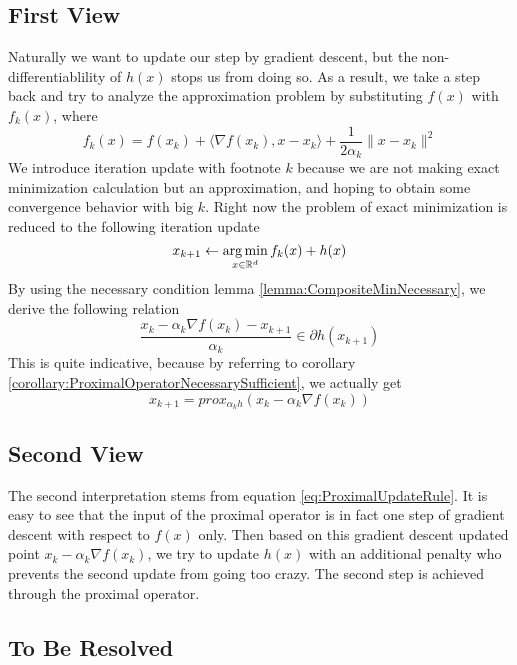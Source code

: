 \subsection*{First View}
Naturally we want to update our step by gradient descent, but the non-differentiablility of $h(x)$ stops us from doing so. As a result, we take a step back and try to analyze the approximation problem by substituting $f(x)$ with $f_k(x)$, where
\begin{equation*}
    f_k(x) = f(x_k) + \langle \nabla f(x_k), x-x_k \rangle + \frac{1}{2\alpha_k} \| x - x_k \|^2
\end{equation*}
We introduce iteration update with footnote $k$ because we are not making exact minimization calculation but an approximation, and hoping to obtain some convergence behavior with big $k$. Right now the problem of exact minimization is reduced to the following iteration update
\begin{equation*}
    x_{k+1} \leftarrow \operatorname*{arg\,min}_{x \in \mathbb{R}^d} f_k(x) + h(x)
\end{equation*}
By using the necessary condition lemma \ref{lemma:CompositeMinNecessary}, we derive the following relation
\begin{equation*}
    \frac{x_k - \alpha_k \nabla f(x_k) - x_{k+1}}{\alpha_k} \in \partial h(x_{k+1})
\end{equation*}
This is quite indicative, because by referring to corollary \ref{corollary:ProximalOperatorNecessarySufficient}, we actually get
\begin{equation}
    x_{k+1} = prox_{\alpha_k h}(x_k - \alpha_k \nabla f(x_k)) \label{eq:ProximalUpdateRule}
\end{equation}

\subsection*{Second View}
The second interpretation stems from equation \ref{eq:ProximalUpdateRule}. It is easy to see that the input of the proximal operator is in fact one step of gradient descent with respect to $f(x)$ only. Then based on this gradient descent updated point $x_k - \alpha_k \nabla f(x_k)$, we try to update $h(x)$ with an additional penalty who prevents the second update from going too crazy. The second step is achieved through the proximal operator. 

\subsection*{To Be Resolved}


